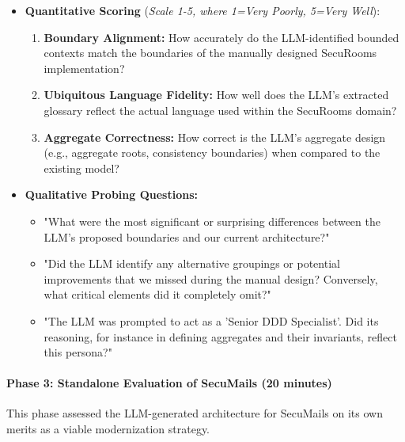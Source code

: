 \begin{itemize}
    \item \textbf{Quantitative Scoring} (\textit{Scale 1-5, where 1=Very Poorly, 5=Very Well}):
    \begin{enumerate}
        \item \textbf{Boundary Alignment:} How accurately do the LLM-identified bounded contexts match the boundaries of the manually designed SecuRooms implementation?
        \item \textbf{Ubiquitous Language Fidelity:} How well does the LLM's extracted glossary reflect the actual language used within the SecuRooms domain?
        \item \textbf{Aggregate Correctness:} How correct is the LLM's aggregate design (e.g., aggregate roots, consistency boundaries) when compared to the existing model?
    \end{enumerate}
    \item \textbf{Qualitative Probing Questions:}
    \begin{itemize}
        \item "What were the most significant or surprising differences between the LLM's proposed boundaries and our current architecture?"
        \item "Did the LLM identify any alternative groupings or potential improvements that we missed during the manual design? Conversely, what critical elements did it completely omit?"
        \item "The LLM was prompted to act as a 'Senior DDD Specialist'. Did its reasoning, for instance in defining aggregates and their invariants, reflect this persona?"
    \end{itemize}
\end{itemize}

\paragraph{Phase 3: Standalone Evaluation of SecuMails (20 minutes)}
This phase assessed the LLM-generated architecture for SecuMails on its own merits as a viable modernization strategy.

